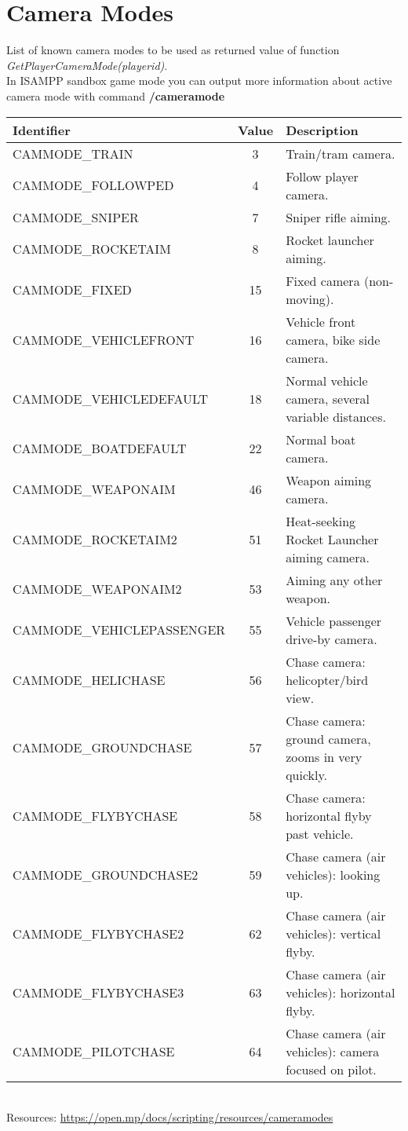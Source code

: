 \documentclass{article}
\begin{document}
\newpage
\section{Camera Modes}
\begin{sloppypar}
List of known camera modes to be used as returned value of function \textit{GetPlayerCameraMode(playerid)}.\\In ISAMPP sandbox game mode you can output more information about active camera mode with command \textbf{/cameramode}
\end{sloppypar}
\bigskip
\noindent\begin{tabular}{ |l|c|l| } 
\hline
Identifier & Value & Description \\
\hline
CAMMODE\_TRAIN & 3 & Train/tram camera. \\
CAMMODE\_FOLLOWPED & 4 & Follow player camera. \\
CAMMODE\_SNIPER & 7 & Sniper rifle aiming. \\
CAMMODE\_ROCKETAIM & 8 & Rocket launcher aiming. \\
CAMMODE\_FIXED & 15 & Fixed camera (non-moving). \\
CAMMODE\_VEHICLEFRONT & 16 & Vehicle front camera, bike side camera. \\
CAMMODE\_VEHICLEDEFAULT & 18 & Normal vehicle camera, several variable distances. \\
CAMMODE\_BOATDEFAULT & 22 & Normal boat camera. \\
CAMMODE\_WEAPONAIM & 46 & Weapon aiming camera. \\
CAMMODE\_ROCKETAIM2 & 51 & Heat-seeking Rocket Launcher aiming camera.\\
CAMMODE\_WEAPONAIM2 & 53 & Aiming any other weapon. \\
CAMMODE\_VEHICLEPASSENGER & 55 & Vehicle passenger drive-by camera. \\
CAMMODE\_HELICHASE & 56 & Chase camera: helicopter/bird view. \\
CAMMODE\_GROUNDCHASE & 57 & Chase camera: ground camera, zooms in very quickly. \\
CAMMODE\_FLYBYCHASE & 58 & Chase camera: horizontal flyby past vehicle. \\
CAMMODE\_GROUNDCHASE2 & 59 & Chase camera (air vehicles): looking up. \\
CAMMODE\_FLYBYCHASE2 & 62 & Chase camera (air vehicles): vertical flyby. \\
CAMMODE\_FLYBYCHASE3 & 63 & Chase camera (air vehicles): horizontal flyby. \\
CAMMODE\_PILOTCHASE & 64 & Chase camera (air vehicles): camera focused on pilot. \\
\hline
\end{tabular}
\bigskip
\\Resources: \url{https://open.mp/docs/scripting/resources/cameramodes}
\end{document}
